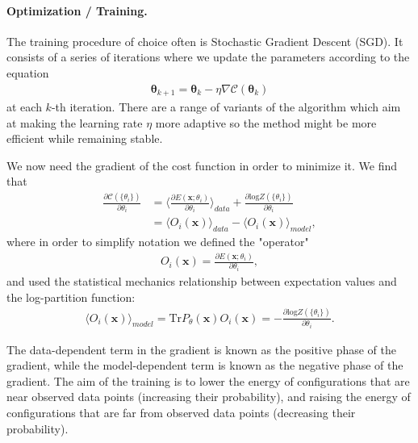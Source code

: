 \documentclass[%
oneside,                 %
final,                   %
10pt]{article}
\begin{document}
\paragraph{Optimization / Training.}
The training procedure of choice often is Stochastic Gradient Descent (SGD). It consists of a series of iterations where we update the parameters according to the equation
\begin{align}
	\bm{\theta}_{k+1} = \bm{\theta}_k - \eta \nabla \mathcal{C} (\bm{\theta}_k)
\end{align}
at each $k$-th iteration. There are a range of variants of the algorithm which aim at making the learning rate $\eta$ more adaptive so the method might be more efficient while remaining stable.

We now need the gradient of the cost function in order to minimize it. We find that
\begin{align}
	\frac{\partial \mathcal{C}(\{ \theta_i\})}{\partial \theta_i}
	&= \langle \frac{\partial E(\bm{x}; \theta_i)}{\partial \theta_i} \rangle_{data}
	+ \frac{\partial \text{log} Z(\{ \theta_i\})}{\partial \theta_i} \\
	&= \langle O_i(\bm{x}) \rangle_{data} - \langle O_i(\bm{x}) \rangle_{model},
\end{align}
where in order to simplify notation we defined the "operator"
\begin{align}
	O_i(\bm{x}) = \frac{\partial E(\bm{x}; \theta_i)}{\partial \theta_i}, 
\end{align}
and used the statistical mechanics relationship between expectation values and the log-partition function:
\begin{align}
	\langle O_i(\bm{x}) \rangle_{model} = \text{Tr} P_\theta(\bm{x})O_i(\bm{x}) = - \frac{\partial \text{log} Z(\{ \theta_i\})}{\partial \theta_i}.
\end{align}

The data-dependent term in the gradient is known as the positive phase
of the gradient, while the model-dependent term is known as the
negative phase of the gradient. The aim of the training is to lower
the energy of configurations that are near observed data points
(increasing their probability), and raising the energy of
configurations that are far from observed data points (decreasing
their probability).
\end{document}
